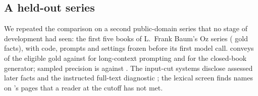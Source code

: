 \subsection{A held-out series}
\label{sec:results-heldout}
We repeated the comparison on a second public-domain series that no stage of development had
seen: the first five books of L.~Frank Baum's Oz series ( gold facts), with
code, prompts and settings frozen before its first model call. \sys conveys
 of the eligible gold against  for long-context prompting and
 for the closed-book generator; sampled precision is  against
. The input-cut systems disclose  assessed later facts and
the instructed full-text diagnostic ; the lexical screen finds
 names on \sys's pages that a reader at the cutoff has not met.

